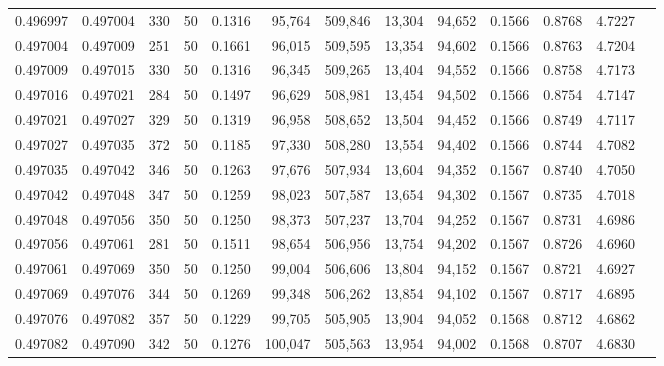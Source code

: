 \begin{tabular}{rrrrrrrrrrrrr}
0.496997 & 0.497004 & 330 &  50 &                                     0.1316 &  95,764 & 509,846 &  13,304 &  94,652 & 0.1566 & 0.8768 & 4.7227 \\
0.497004 & 0.497009 & 251 &  50 &                                     0.1661 &  96,015 & 509,595 &  13,354 &  94,602 & 0.1566 & 0.8763 & 4.7204 \\
0.497009 & 0.497015 & 330 &  50 &                                     0.1316 &  96,345 & 509,265 &  13,404 &  94,552 & 0.1566 & 0.8758 & 4.7173 \\
0.497016 & 0.497021 & 284 &  50 &                                     0.1497 &  96,629 & 508,981 &  13,454 &  94,502 & 0.1566 & 0.8754 & 4.7147 \\
0.497021 & 0.497027 & 329 &  50 &                                     0.1319 &  96,958 & 508,652 &  13,504 &  94,452 & 0.1566 & 0.8749 & 4.7117 \\
0.497027 & 0.497035 & 372 &  50 &                                     0.1185 &  97,330 & 508,280 &  13,554 &  94,402 & 0.1566 & 0.8744 & 4.7082 \\
0.497035 & 0.497042 & 346 &  50 &                                     0.1263 &  97,676 & 507,934 &  13,604 &  94,352 & 0.1567 & 0.8740 & 4.7050 \\
0.497042 & 0.497048 & 347 &  50 &                                     0.1259 &  98,023 & 507,587 &  13,654 &  94,302 & 0.1567 & 0.8735 & 4.7018 \\
0.497048 & 0.497056 & 350 &  50 &                                     0.1250 &  98,373 & 507,237 &  13,704 &  94,252 & 0.1567 & 0.8731 & 4.6986 \\
0.497056 & 0.497061 & 281 &  50 &                                     0.1511 &  98,654 & 506,956 &  13,754 &  94,202 & 0.1567 & 0.8726 & 4.6960 \\
0.497061 & 0.497069 & 350 &  50 &                                     0.1250 &  99,004 & 506,606 &  13,804 &  94,152 & 0.1567 & 0.8721 & 4.6927 \\
0.497069 & 0.497076 & 344 &  50 &                                     0.1269 &  99,348 & 506,262 &  13,854 &  94,102 & 0.1567 & 0.8717 & 4.6895 \\
0.497076 & 0.497082 & 357 &  50 &                                     0.1229 &  99,705 & 505,905 &  13,904 &  94,052 & 0.1568 & 0.8712 & 4.6862 \\
0.497082 & 0.497090 & 342 &  50 &                                     0.1276 & 100,047 & 505,563 &  13,954 &  94,002 & 0.1568 & 0.8707 & 4.6830 \\

\end{tabular}
